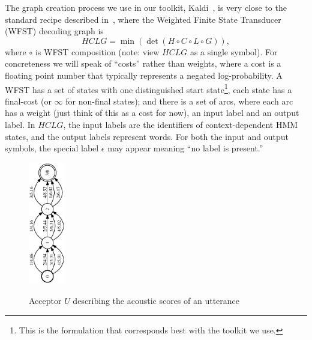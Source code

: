 \documentclass{article}
\def\HCLG{{\mathit{HCLG}}}
\begin{document}
The graph creation process we use in our toolkit, Kaldi~\cite{kaldi_paper},
is very close to the standard recipe described in~\cite{wfst},
where the Weighted Finite State Transducer (WFST) decoding graph is
\begin{equation}
  \HCLG = \min(\det(H \circ C \circ L \circ G)),
\end{equation}
where $\circ$ is WFST composition (note: view $\HCLG$ as a single symbol).
For concreteness we will speak of ``costs'' rather
than weights, where a cost is a floating point number that typically represents a negated
log-probability.  A WFST has a set of states with one distinguished
start state\footnote{This is the formulation that corresponds best with the toolkit we use.},
each state has a final-cost (or $\infty$ for non-final states);
and there is a set of arcs, where each arc has a weight
(just think of this as a cost for now), an input label and an output
label.  In $\HCLG$, the input labels are the identifiers of context-dependent
HMM states, and the output labels represent words.  For both the input and output
symbols, the special label $\epsilon$ may appear meaning ``no label is present.''


\begin{figure}
\begin{center}
\includegraphics[height=2.1in,angle=270]{figures/acceptor_utterance.eps}
  \caption{Acceptor $U$ describing the acoustic scores of an utterance}
\vspace*{-0.2in}
\label{fig:acceptor}
\end{center}

\end{figure}
\end{document}
